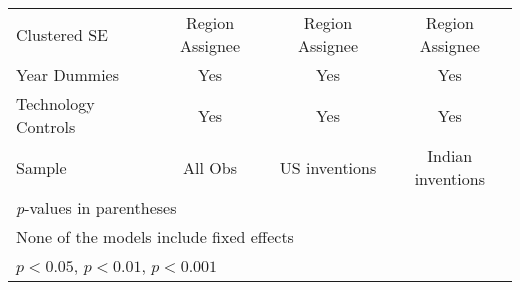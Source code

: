 {\begin{longtable}{l*{3}{c}}
Clustered SE       &Region Assignee         &Region Assignee         &Region Assignee         \\
Year Dummies            &      Yes         &      Yes         &      Yes         \\
Technology Controls            &      Yes         &      Yes         &      Yes         \\
Sample          &  All Obs         &US inventions         &Indian inventions         \\
\hline\hline
\multicolumn{4}{l}{\footnotesize \textit{p}-values in parentheses}\\
\multicolumn{4}{l}{\footnotesize None of the models include fixed effects}\\
\multicolumn{4}{l}{\footnotesize \sym{*} \(p<0.05\), \sym{**} \(p<0.01\), \sym{***} \(p<0.001\)}\\
\end{longtable}
}
